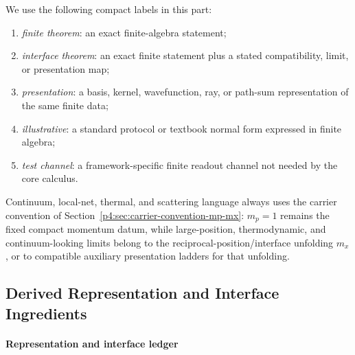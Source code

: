 \documentclass[12pt,a4paper]{article}
\begin{document}
We use the following compact labels in this part:
\begin{enumerate}[label=(\roman*), leftmargin=2em]
\item \emph{finite theorem}: an exact finite-algebra statement;
\item \emph{interface theorem}: an exact finite statement plus a stated compatibility, limit, or presentation map;
\item \emph{presentation}: a basis, kernel, wavefunction, ray, or path-sum representation of the same finite data;
\item \emph{illustrative}: a standard protocol or textbook normal form expressed in finite algebra;
\item \emph{test channel}: a framework-specific finite readout channel not needed by the core calculus.
\end{enumerate}
Continuum, local-net, thermal, and scattering language always uses the carrier convention of Section~\ref{p4:sec:carrier-convention-mp-mx}: \(m_p=1\) remains the fixed compact momentum datum, while large-position, thermodynamic, and continuum-looking limits belong to the reciprocal-position/interface unfolding \(m_x\), or to compatible auxiliary presentation ladders for that unfolding.



\subsection{Derived Representation and Interface Ingredients}
\label{p4:sec:part2-inventory}



\paragraph{Representation and interface ledger}
\label{p4:sec:part2-inventory-ledger}

\begingroup
\small
\setlength{\tabcolsep}{4pt}
\renewcommand{\arraystretch}{1.12}
\end{document}
